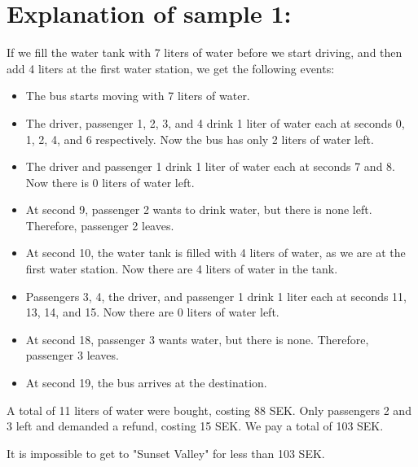 \section*{Explanation of sample 1:}
If we fill the water tank with 7 liters of water before we start driving, and then add 4 liters at the first water station, we get the following events:

\begin{itemize}
  \item The bus starts moving with 7 liters of water.
  \item The driver, passenger 1, 2, 3, and 4 drink 1 liter of water each at seconds 0, 1, 2, 4, and 6 respectively. Now the bus has only 2 liters of water left.
  \item The driver and passenger 1 drink 1 liter of water each at seconds 7 and 8. Now there is 0 liters of water left.
  \item At second 9, passenger 2 wants to drink water, but there is none left. Therefore, passenger 2 leaves.
  \item At second 10, the water tank is filled with 4 liters of water, as we are at the first water station. Now there are 4 liters of water in the tank.
  \item Passengers 3, 4, the driver, and passenger 1 drink 1 liter each at seconds 11, 13, 14, and 15. Now there are 0 liters of water left.
  \item At second 18, passenger 3 wants water, but there is none. Therefore, passenger 3 leaves.
  \item At second 19, the bus arrives at the destination.
\end{itemize}

A total of 11 liters of water were bought, costing 88 SEK. Only passengers 2 and 3 left and demanded a refund, costing 15 SEK. We pay a total of 103 SEK.

It is impossible to get to "Sunset Valley" for less than 103 SEK.